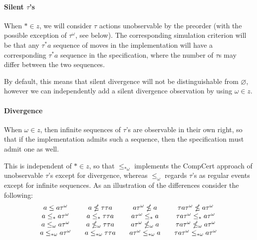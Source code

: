 \documentclass[11pt]{article}
\begin{document}

\paragraph{Silent $\tau$'s} %

When $* \in z$,
we will consider $\tau$ actions
unobservable by the preorder
(with the possible exception of $\tau^\omega$, see below).
The corresponding simulation criterion will be that
any $\tau^* a$ sequence of moves in the implementation
will have a corresponding $\tau^* a$ sequence in the specification,
where the number of $\tau$s may differ between the two sequences.

By default,
this means that silent divergence will not be
distinguishable from $\varnothing$,
however we can independently add a
silent divergence observation by using $\omega \in z$.


\paragraph{Divergence} %

When $\omega \in z$,
then infinite sequences of $\tau$'s
are observable in their own right,
so that if the implementation admits such a sequence,
then the specification must admit one as well.

This is independent of $* \in z$,
so that $\le_{*\omega}$
implements the CompCert approach of
unobservable $\tau$'s except for divergence,
whereas $\le_{\omega}$
regards $\tau$'s as regular events
except for infinite sequences.
As an illustration of the differences consider the following:
\[
  \begin{array}{c@{\qquad}c@{\qquad}c@{\qquad}c}
    a                     \le                   a \tau^\omega &
    a                     \nleq                 \tau \tau a &
    a \tau^\omega         \nleq                 a &
    \tau a \tau^\omega    \nleq                 a \tau^\omega
    \\
    a                     \le_*                 a \tau^\omega &
    a                     \le_*                 \tau \tau a &
    a \tau^\omega         \le_*                 a &
    \tau a \tau^\omega    \le_*                 a \tau^\omega
    \\
    a                     \le_\omega            a \tau^\omega &
    a                     \nleq_\omega          \tau \tau a &
    a \tau^\omega         \nleq_\omega          a &
    \tau a \tau^\omega    \nleq_\omega          a \tau^\omega
    \\
    a                     \le_{*\omega}         a \tau^\omega &
    a                     \le_{*\omega}         \tau \tau a &
    a \tau^\omega         \le_{*\omega}         a &
    \tau a \tau^\omega    \le_{*\omega}         a \tau^\omega
  \end{array}
\]
\end{document}
